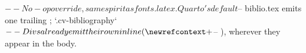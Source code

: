$-- No-op override, same spirit as fonts.latex. Quarto's default
$-- biblio.tex emits one trailing \printbibliography; `.cv-bibliography`
$-- Divs already emit their own inline (\nocite + \newrefcontext +
$-- \printbibliography), wherever they appear in the body.
